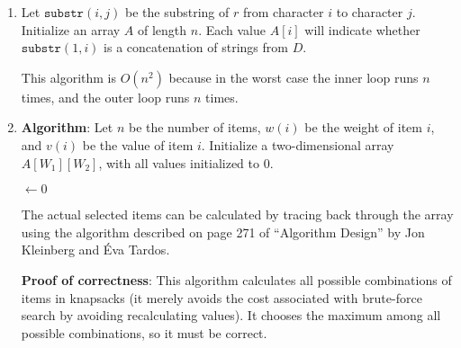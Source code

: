 \documentclass[a4paper, 10pt]{article}
\begin{document}
\begin{enumerate}
	\item Let $\texttt{substr}(i, j)$ be the substring of $r$ from character $i$
		to character $j$. Initialize an array $A$ of length $n$. Each value
		$A[i]$ will indicate whether $\texttt{substr}(1, i)$ is a concatenation
		of strings from $D$.

		\IncMargin{1em}
		\begin{algorithm}[h]
			\label{alg:prob2}
		\end{algorithm}

		This algorithm is $O(n^2)$ because in the worst case the inner loop runs
		$n$ times, and the outer loop runs $n$ times.

	\item \textbf{Algorithm}: Let $n$ be the number of items, $w(i)$ be the
		weight of item $i$, and $v(i)$ be the value of item $i$. Initialize a
		two-dimensional array $A[W_1][W_2]$, with all values initialized to 0.

		\begin{algorithm}[h]
			\maxValue $\gets 0$\;
			\Return{\maxValue}
			\label{alg:prob3}
		\end{algorithm}

		The actual selected items can be calculated by tracing back through the
		array using the algorithm described on page 271 of ``Algorithm Design''
		by Jon Kleinberg and Éva Tardos.

		\textbf{Proof of correctness}: This algorithm calculates all possible
		combinations of items in knapsacks (it merely avoids the cost associated
		with brute-force search by avoiding recalculating values). It chooses
		the maximum among all possible combinations, so it must be correct.


\end{enumerate}
\end{document}

